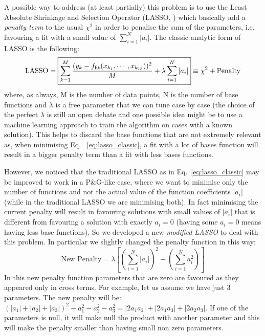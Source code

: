 \documentclass[11pt]{article}
\begin{document}
A possible way to address (at least partially) this problem is to use the Least Absolute Shrinkage and Selection Operator (LASSO, \citealt{LASSO}) which basically add a \textit{penalty term} to the usual $\chi^2$ in order to penalise the sum of the parameters, i.e. favouring a fit with a small value of $\sum_{i=1}^N \lvert  a_i \rvert$. The classic analytic form of LASSO is the following: 
%
\begin{equation}
\label{eq:lasso_classic}
\rm{LASSO} = \boxed{ \sum_{k=1}^M\frac{(y_k - f_{\rm{fit}}(x_{k_1},\cdots,x_{k_{13}}))^2}{M} + \lambda\sum_{i=1}^N {\lvert} a_i {\rvert}} \equiv \chi^2 + \rm{Penalty}
\end{equation}
%
where, as always, M is the number of data points, N is the number of base functions and $\lambda$ is a free parameter that we can tune case by case (the choice of the perfect $\lambda$ is still an open debate and one possible idea might be to use a machine learning approach to train the algorithm on cases with a known solution). 
This helps to discard the base functions that are not extremely relevant as, when minimising Eq. ~\ref{eq:lasso_classic}, a fit with a lot of bases function will result in a bigger penalty term than a fit with less bases functions.

However, we noticed that the traditional LASSO as in Eq.~\ref{eq:lasso_classic} may be improved to work in a P$\&$G-like case, where we want to minimise only the number of functions and not the actual value of the function coefficients $\lvert a_i\rvert$ (while in the traditional LASSO we are minimising both). In fact minimising the current penalty will result in favouring solutions with small values of $\lvert a_i\rvert$ that is different from favouring a solution with exactly $a_i=0$ (having some $a_i=0$ means having less base functions). So we developed a new \textit{modified LASSO} to deal with this problem. In particular we slightly changed the penalty function in this way:
%
\begin{equation}
\label{eq:new_penalty}
\text{New Penalty} = \lambda \left[ \left( \sum_{i=1}^N \lvert a_i \rvert \right)^2 - \left(\sum_{i=1}^N a_i^2\right)\right]
\end{equation}
%
In this new penalty function parameters that are zero are favoured as they appeared only in cross terms. For example, let us assume we have just 3 parameters. The new penalty will be: $(|a_1| + |a_2| + |a_3|)^2 - a_1^2 -a_2^2 - a_3^2 = |2 a_1a_2| + |2 a_1a_3| +|2a_2a_3|$. If one of the parameters is null, it will make null the product with another parameter and this will make the penalty smaller than having small non zero parameters. 
\end{document}
